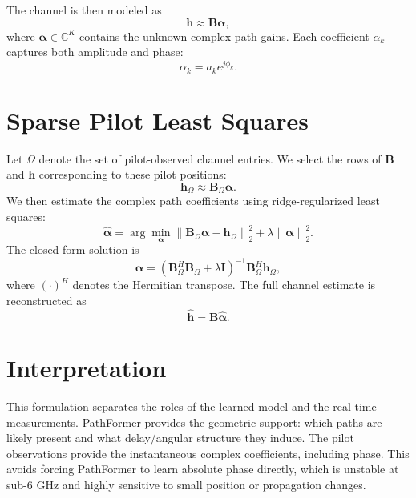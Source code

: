 \documentclass[10pt,conference]{IEEEtran}
\begin{document}
The channel is then modeled as
\begin{equation}
    \mathbf{h} \approx \mathbf{B}\boldsymbol{\alpha},
\end{equation}
where $\boldsymbol{\alpha} \in \mathbb{C}^{K}$ contains the unknown complex path gains. Each coefficient $\alpha_k$ captures both amplitude and phase:
\begin{equation}
    \alpha_k = a_k e^{j\phi_k}.
\end{equation}

\section{Sparse Pilot Least Squares}

Let $\Omega$ denote the set of pilot-observed channel entries. We select the rows of $\mathbf{B}$ and $\mathbf{h}$ corresponding to these pilot positions:
\begin{equation}
    \mathbf{h}_{\Omega} \approx \mathbf{B}_{\Omega}\boldsymbol{\alpha}.
\end{equation}
We then estimate the complex path coefficients using ridge-regularized least squares:
\begin{equation}
    \hat{\boldsymbol{\alpha}}
    =
    \arg\min_{\boldsymbol{\alpha}}
    \left\|
    \mathbf{B}_{\Omega}\boldsymbol{\alpha}
    -
    \mathbf{h}_{\Omega}
    \right\|_2^2
    +
    \lambda
    \left\|
    \boldsymbol{\alpha}
    \right\|_2^2.
\end{equation}
The closed-form solution is
\begin{equation}
    \hat{\boldsymbol{\alpha}}
    =
    \left(
    \mathbf{B}_{\Omega}^{H}\mathbf{B}_{\Omega}
    +
    \lambda\mathbf{I}
    \right)^{-1}
    \mathbf{B}_{\Omega}^{H}\mathbf{h}_{\Omega},
\end{equation}
where $(\cdot)^H$ denotes the Hermitian transpose. The full channel estimate is reconstructed as
\begin{equation}
    \hat{\mathbf{h}} = \mathbf{B}\hat{\boldsymbol{\alpha}}.
\end{equation}

\section{Interpretation}

This formulation separates the roles of the learned model and the real-time measurements. PathFormer provides the geometric support: which paths are likely present and what delay/angular structure they induce. The pilot observations provide the instantaneous complex coefficients, including phase. This avoids forcing PathFormer to learn absolute phase directly, which is unstable at sub-6 GHz and highly sensitive to small position or propagation changes.
\end{document}

